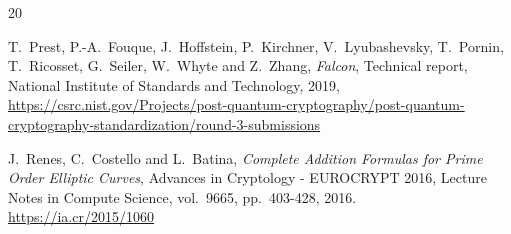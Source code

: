 \documentclass{llncs}
\begin{document}
\begin{thebibliography}{20}









T.~Prest, P.-A.~Fouque, J.~Hoffstein, P.~Kirchner,
V.~Lyubashevsky, T.~Pornin, T.~Ricosset, G.~Seiler, W.~Whyte and Z.~Zhang,
\emph{Falcon},
Technical report, National Institute of Standards and Technology, 2019,
\url{https://csrc.nist.gov/Projects/post-quantum-cryptography/post-quantum-cryptography-standardization/round-3-submissions}

J.~Renes, C.~Costello and L.~Batina,
\emph{Complete Addition Formulas for Prime Order Elliptic Curves},
Advances in Cryptology - EUROCRYPT 2016, Lecture Notes in Compute Science,
vol.~9665, pp.~403-428, 2016.\\
\url{https://ia.cr/2015/1060}


\end{thebibliography}
\end{document}
